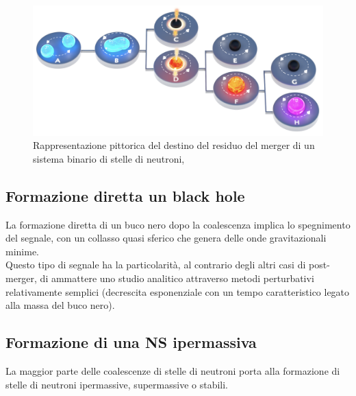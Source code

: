 \vspace{0pt}
\begin{figure}
	\includegraphics[scale=0.2]{figures/Capitolo_1/MagnetarEvolution.png}
	\captionsetup{width=0.8\textwidth}
	\caption{Rappresentazione pittorica del destino del residuo del merger di un sistema binario di stelle di neutroni, \cite{sarin2020evolution}}
	\label{fig:EvoluzioneBNS}
	\vspace{-20pt}
\end{figure}

\subsection{Formazione diretta un black hole}	
\label{subsection:Diretto_Black_hole}
La formazione diretta di un buco nero dopo la coalescenza implica lo spegnimento del segnale, con un collasso quasi sferico che genera delle onde gravitazionali minime\cite{sarin2020evolution}.\\
Questo tipo di segnale ha la particolarità, al contrario degli altri casi di post-merger, di ammattere uno studio analitico attraverso metodi perturbativi relativamente semplici (decrescita esponenziale con un tempo caratteristico legato alla massa del buco nero)\cite{maggiore2018gravitational}.

\subsection{Formazione di una NS ipermassiva}
\label{subsection:ipermassiva}	
La maggior parte delle coalescenze di stelle di neutroni porta alla formazione di stelle di neutroni ipermassive, supermassive o stabili. 

